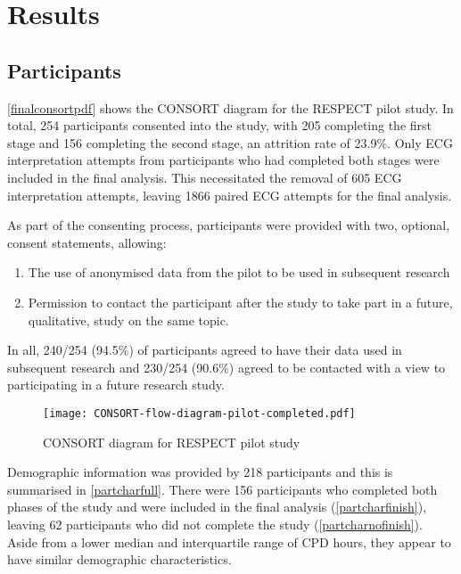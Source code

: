 \chapter{Results}
\label{results}


\section{Participants}
\label{participants}

\autoref{finalconsortpdf} shows the CONSORT diagram for the RESPECT pilot study. In total, 254 participants consented into the study, with 205 completing the first stage and 156 completing the second stage, an attrition rate of 23.9\%. Only ECG interpretation attempts from participants who had completed both stages were included in the final analysis. This necessitated the removal of 605 ECG interpretation attempts, leaving 1866 paired ECG attempts for the final analysis.

As part of the consenting process, participants were provided with two, optional, consent statements, allowing:

\begin{enumerate}
\item The use of anonymised data from the pilot to be used in subsequent research

\item Permission to contact the participant after the study to take part in a future, qualitative, study on the same topic.

\end{enumerate}

In all, 240\slash 254 (94.5\%) of participants agreed to have their data used in subsequent research and 230\slash 254 (90.6\%) agreed to be contacted with a view to participating in a future research study.

\begin{figure}[htbp]
\centering
\texttt{[image: CONSORT-flow-diagram-pilot-completed.pdf]}
\caption{CONSORT diagram for RESPECT pilot study}
\label{finalconsortpdf}
\end{figure}



 \newpage 

Demographic information was provided by 218 participants and this is summarised in \autoref{partcharfull}. There were 156 participants who completed both phases of the study and were included in the final analysis (\autoref{partcharfinish}), leaving 62 participants who did not complete the study (\autoref{partcharnofinish}). Aside from a lower median and interquartile range of CPD hours, they appear to have similar demographic characteristics. 

